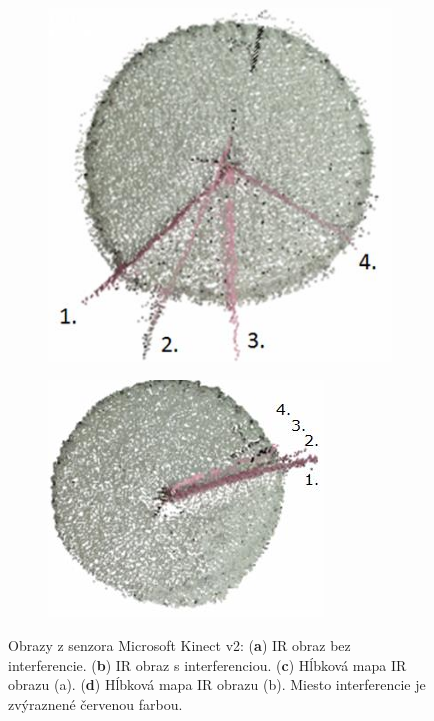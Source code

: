 \begin{figure}[h]
	\centering
	\begin{subfigure}[b]{0.42\textwidth}
		\centering
		\includegraphics[width=\textwidth]{figures/dynamic_result_seq.png}
		\caption{}
		\label{fig:depthir:a}
	\end{subfigure}
	\hfill
	\begin{subfigure}[b]{0.42\textwidth}
		\centering
		\includegraphics[width=\textwidth]{figures/dynamic_result_par.png}
		\caption{}
		\label{fig:depthir:b}
	\end{subfigure}
	\caption{Obrazy z senzora Microsoft Kinect v2: (\textbf{a}) IR obraz bez interferencie. (\textbf{b}) IR obraz s interferenciou. (\textbf{c}) Hĺbková mapa IR obrazu (a). (\textbf{d}) Hĺbková mapa IR obrazu (b). Miesto interferencie je zvýraznené červenou farbou.}
	\label{fig:depthir}
\end{figure}


